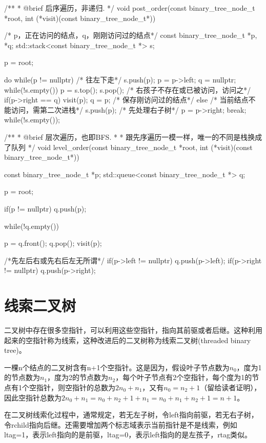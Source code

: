 \begin{Codex}[label=binary_tree.cpp]
/**
 * @brief 后序遍历，非递归.
 */
void post_order(const binary_tree_node_t *root,
                int (*visit)(const binary_tree_node_t*)) {
    /* p，正在访问的结点，q，刚刚访问过的结点*/
    const binary_tree_node_t *p, *q;
    std::stack<const binary_tree_node_t *> s;

    p = root;

    do {
        while(p != nullptr) { /* 往左下走*/
            s.push(p);
            p = p->left;
        }
        q = nullptr;
        while(!s.empty()) {
            p = s.top();
            s.pop();
            /* 右孩子不存在或已被访问，访问之*/
            if(p->right == q) {
                visit(p);
                q = p; /* 保存刚访问过的结点*/
            } else {
                /* 当前结点不能访问，需第二次进栈*/
                s.push(p);
                /* 先处理右子树*/
                p = p->right;
                break;
            }
        }
    } while(!s.empty());
}

/**
 * @brief 层次遍历，也即BFS.
 *
 * 跟先序遍历一模一样，唯一的不同是栈换成了队列
 */
void level_order(const binary_tree_node_t *root,
                int (*visit)(const binary_tree_node_t*)) {
    const binary_tree_node_t *p;
    std::queue<const binary_tree_node_t *> q;

    p = root;

    if(p != nullptr) q.push(p);

    while(!q.empty()) {
        p = q.front();
        q.pop();
        visit(p);

        /*先左后右或先右后左无所谓*/
        if(p->left != nullptr) q.push(p->left);
        if(p->right != nullptr) q.push(p->right);
    }
}
\end{Codex}

\section{线索二叉树} %
二叉树中存在很多空指针，可以利用这些空指针，指向其前驱或者后继。这种利用起来的空指针称为线索，这种改进后的二叉树称为线索二叉树(threaded binary tree)。

一棵n个结点的二叉树含有n+1个空指针。这是因为，假设叶子节点数为$n_0$，度为1的节点数为$n_1$，度为2的节点数为$n_2$，每个叶子节点有2个空指针，每个度为1的节点有1个空指针，则空指针的总数为$2n_0+n_1$，又有$n_0=n_2+1$（留给读者证明），因此空指针总数为$2n_0+n_1=n_0+n_2+1+n_1=n_0+n_1+n_2+1=n+1$。

在二叉树线索化过程中，通常规定，若无左子树，令left指向前驱，若无右子树，令rchild指向后继。还需要增加两个标志域表示当前指针是不是线索，例如ltag=1，表示left指向的是前驱，ltag=0，表示left指向的是左孩子，rtag类似。

